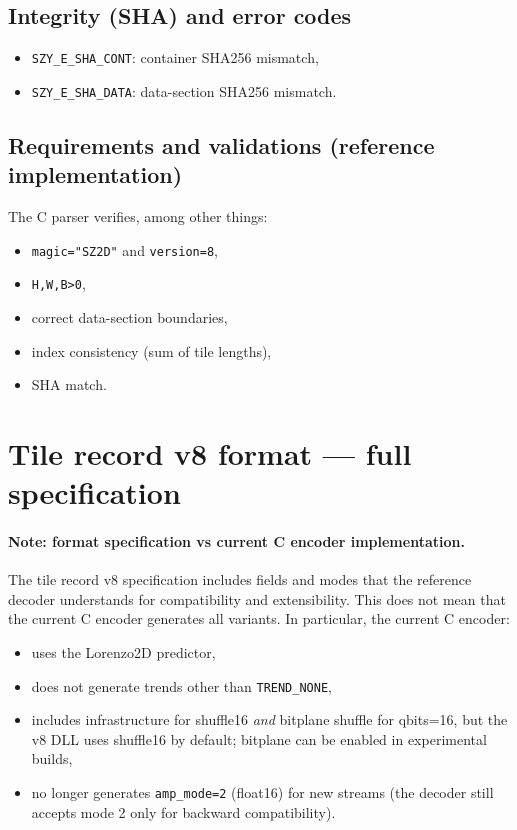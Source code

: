 \documentclass[11pt,a4paper]{article}
\begin{document}
\subsection{Integrity (SHA) and error codes}
\begin{itemize}
  \item \texttt{SZY\_E\_SHA\_CONT}: container SHA256 mismatch,
  \item \texttt{SZY\_E\_SHA\_DATA}: data-section SHA256 mismatch.
\end{itemize}

\subsection{Requirements and validations (reference implementation)}
The C parser verifies, among other things:
\begin{itemize}
  \item \texttt{magic="SZ2D"} and \texttt{version=8},
  \item \texttt{H,W,B>0},
  \item correct data-section boundaries,
  \item index consistency (sum of tile lengths),
  \item SHA match.
\end{itemize}

\section{Tile record v8 format --- full specification}

\paragraph{Note: format specification vs current C encoder implementation.}
The tile record v8 specification includes fields and modes that the reference decoder understands for compatibility and extensibility. This does not mean that the current C encoder generates all variants. In particular, the current C encoder:
\begin{itemize}
  \item uses the Lorenzo2D predictor,
  \item does not generate trends other than \texttt{TREND\_NONE},
  \item includes infrastructure for shuffle16 \emph{and} bitplane shuffle for qbits=16, but the v8 DLL uses shuffle16 by default; bitplane can be enabled in experimental builds,
  \item no longer generates \texttt{amp\_mode=2} (float16) for new streams (the decoder still accepts mode 2 only for backward compatibility).
\end{itemize}
\end{document}
